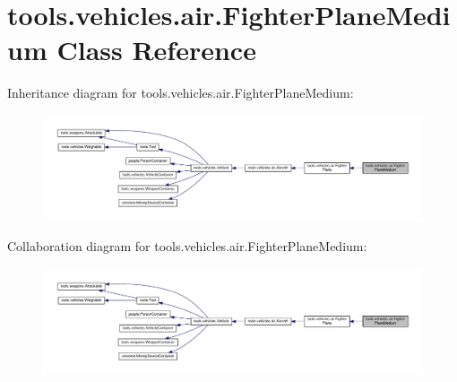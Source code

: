 \hypertarget{classtools_1_1vehicles_1_1air_1_1_fighter_plane_medium}{}\section{tools.\+vehicles.\+air.\+Fighter\+Plane\+Medium Class Reference}
\label{classtools_1_1vehicles_1_1air_1_1_fighter_plane_medium}


Inheritance diagram for tools.\+vehicles.\+air.\+Fighter\+Plane\+Medium\+:
\nopagebreak
\begin{figure}[H]
\begin{center}
\leavevmode
\includegraphics[width=350pt]{classtools_1_1vehicles_1_1air_1_1_fighter_plane_medium__inherit__graph}
\end{center}
\end{figure}


Collaboration diagram for tools.\+vehicles.\+air.\+Fighter\+Plane\+Medium\+:
\nopagebreak
\begin{figure}[H]
\begin{center}
\leavevmode
\includegraphics[width=350pt]{classtools_1_1vehicles_1_1air_1_1_fighter_plane_medium__coll__graph}
\end{center}
\end{figure}
